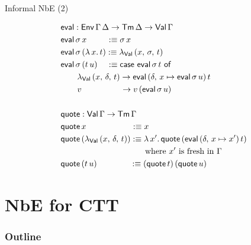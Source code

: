 \documentclass[dvipsnames]{beamer}
\newcommand{\ms}[1]{\mathsf{#1}}
\newcommand{\Tm}{\mathsf{Tm}}
\newcommand{\defn}{:\equiv}
\newcommand{\Env}{\ms{Env}}
\newcommand{\Val}{\ms{Val}}
\newcommand{\eval}{\ms{eval}}
\newcommand{\qt}{\ms{quote}}
\begin{document}
\begin{frame}{Informal NbE (2)}

\begin{alignat*}{3}
  & \eval : \Env\,\Gamma\,\Delta \to \Tm\,\Delta \to \Val\,\Gamma \\
  & \eval\,\sigma\,x \hspace{2.4em} \defn \sigma\,x \\
  & \eval\,\sigma\,(\lambda\,x.\,t) \defn \lambda_{\Val}\,(x,\,\sigma,\,t) \\
  & \eval\,\sigma\,(t\,u) \hspace{1.1em}\defn \ms{case}\,\,\eval\,\sigma\,t\,\,\ms{of} \\
  & \hspace{2em} \lambda_{\Val}\,(x,\,\delta,\,t) \to \eval\,(\delta,\,x \mapsto \eval\,\sigma\,u)\,t\\
  & \hspace{2em} v \hspace{4.7em} \to v\,(\eval\,\sigma\,u) \\
  & \\
  & \qt : \Val\,\Gamma \to \Tm\,\Gamma \\
  & \qt\,x \hspace{5.4em} \defn  x \\
  & \qt\,(\lambda_{\Val}\,(x,\,\delta,\,t)) \defn  \lambda\,x'.\,\qt\,(\eval\,(\delta,\,x \mapsto x')\,t) \\
  & \hspace{10.2em}\text{where $x'$ is fresh in $\Gamma$}\\
  & \qt\,(t\,u)\hspace{4em} \defn  (\qt\,t)\,(\qt\,u)
\end{alignat*}

\end{frame}

\section{NbE for CTT}
\begin{frame}
  \frametitle{Outline}
  \tableofcontents[currentsection]
\end{frame}
\end{document}
